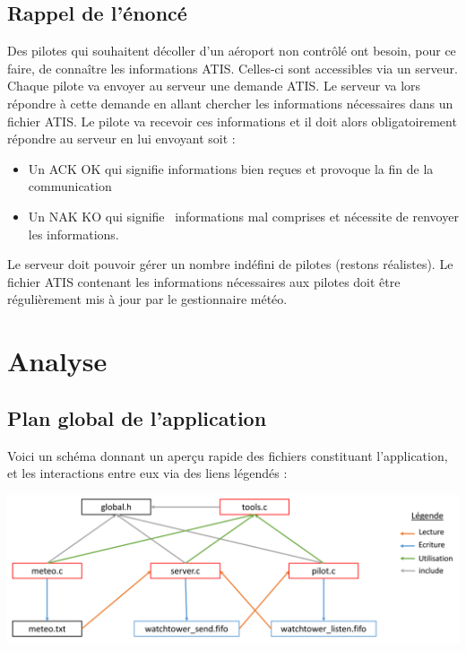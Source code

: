 \documentclass{report}
\begin{document}
	\section{Rappel de l'énoncé}

		Des pilotes qui souhaitent décoller d’un aéroport non contrôlé ont besoin, pour ce faire, de connaître les informations ATIS. Celles-ci sont accessibles via un serveur.
		Chaque pilote va envoyer au serveur une demande ATIS. Le serveur va lors répondre à cette demande en allant chercher les informations nécessaires dans un fichier ATIS.
		Le pilote va recevoir ces informations et il doit alors obligatoirement répondre au serveur en lui envoyant soit :\newline
		\begin{itemize}
			\item Un ACK OK qui signifie \og informations bien reçues \fg et provoque la fin de la communication
			\item Un NAK KO qui signifie \og informations mal comprises \fg et nécessite de renvoyer les informations.
		\end{itemize}

		Le serveur doit pouvoir gérer un nombre indéfini de pilotes (restons réalistes).
		Le fichier ATIS contenant les informations nécessaires aux pilotes doit être régulièrement mis à jour par le gestionnaire météo.

\chapter{Analyse}

	\section{Plan global de l'application}
		Voici un schéma donnant un aperçu rapide des fichiers constituant l'application, et les interactions entre eux via des liens légendés : \newline

		\includegraphics[width=\linewidth, frame]{schemasProjet.png} \newline
\end{document}
